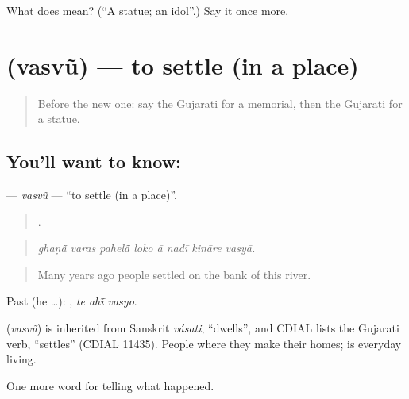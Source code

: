 \begin{tcolorbox}[breakable,colback=teal!4,colframe=teal!35!black,title={Before you move on}]
What does  mean? (\textquotedblleft{}A statue; an idol\textquotedblright{}.) Say it once more.
\end{tcolorbox}
\section[\texorpdfstring{\gu{વસવું} (vasvũ)}{વસવું (vasvũ)}]{ (vasvũ) — to settle (in a place)}

\label{lesson:GU-C319-vasvu}



\begin{quote}
Before the new one: say the Gujarati for a memorial, then the Gujarati for a statue.
\end{quote}

\subsection*{You'll want to know: }
\textbf{} — \emph{vasvũ} — \textquotedblleft{}to settle (in a place)\textquotedblright{}.

\begin{quote}
       .
\end{quote}

\begin{quote}
\emph{ghaṇā̃ varas pahelā̃ loko ā nadī kināre vasyā.}
\end{quote}

\begin{quote}
Many years ago people settled on the bank of this river.
\end{quote}

Past (he …):   , \emph{te ahī̃ vasyo}.

\begin{cousinweb}
\textbf{} (\emph{vasvũ}) is inherited from Sanskrit \emph{vásati}, \textquotedblleft{}dwells\textquotedblright{}, and CDIAL lists the Gujarati verb, \textquotedblleft{}settles\textquotedblright{} (CDIAL 11435). People \textbf{ } where they make their homes; \textbf{} is everyday living.
\end{cousinweb}

\begin{grammarlens}[title={What you've built}]
One more word for telling what happened.
\end{grammarlens}

